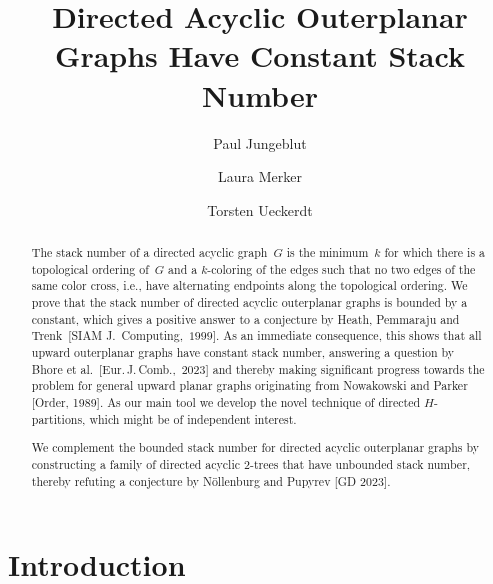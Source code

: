\documentclass{article}
\author{Paul Jungeblut \and Laura Merker \and Torsten Ueckerdt}\date{}
\title{Directed Acyclic Outerplanar Graphs Have Constant Stack Number}
\begin{document}
\maketitle

\begin{abstract}
    The stack number of a directed acyclic graph~$G$ is the minimum~$k$ for which there is a topological ordering of~$G$ and a $k$-coloring of the edges such that no two edges of the same color cross, i.e., have alternating endpoints along the topological ordering.
    We prove that the stack number of directed acyclic outerplanar graphs
    is bounded by a constant, which gives a positive answer to a conjecture by Heath, Pemmaraju and Trenk~[SIAM J.\ Computing,~$1999$].
    As an immediate consequence, this shows that all upward outerplanar graphs have constant stack number, answering a question by Bhore et al.~[Eur.\,J.\,Comb.,~2023] and thereby making significant progress towards the problem for general upward planar graphs originating from Nowakowski and Parker [Order, 1989]. 
    As our main tool we develop the novel technique of directed $H$-partitions, which might be of independent interest.

    We complement the bounded stack number for directed acyclic outerplanar graphs by constructing a family of directed acyclic $2$-trees that have unbounded stack number, 
    thereby refuting a conjecture by Nöllenburg and Pupyrev [GD 2023].
\end{abstract}


\section{Introduction}
\end{document}
